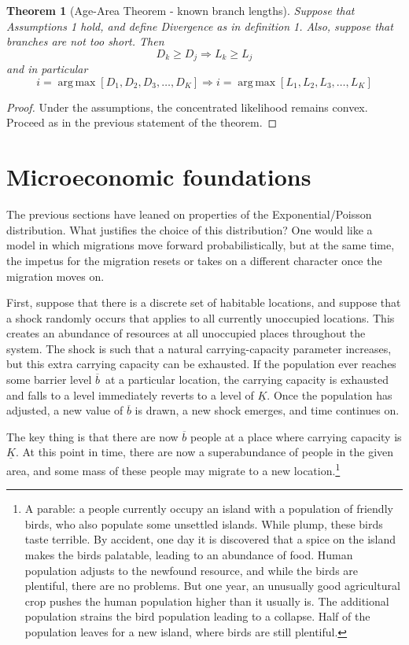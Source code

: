\documentclass[11pt]{article}
\newtheorem{theorem}{Theorem}
\DeclareMathOperator*{\argmax}{arg\,max}
\begin{document}
{\begin{theorem}[Age-Area Theorem  - known branch lengths]
Suppose that Assumptions 1 hold, and define Divergence as in definition 1. Also, suppose that branches are not too short.  Then  
\begin{equation*}
D_k \geq D_j \Longrightarrow L_k\geq L_j
\end{equation*}
and in particular
\begin{equation*}
i=\argmax\left[D_1,D_2,D_3,\hdots,D_{K}\right] \Longrightarrow i=\argmax\left[L_1,L_2,L_3,\hdots,L_K\right]
\end{equation*}
\end{theorem}

\begin{proof}
Under the assumptions, the concentrated likelihood remains convex. Proceed as in the previous statement of the theorem.
\end{proof}

\section{Microeconomic foundations}

The previous sections have leaned on properties of the Exponential/Poisson distribution. What justifies the choice of this distribution? One would like a model in which migrations move forward probabilistically, but at the same time, the impetus for the migration resets or takes on a different character once the migration moves on. 

First, suppose that there is a discrete set of habitable locations, and suppose that a shock randomly occurs that applies to all currently unoccupied locations. This creates an abundance of resources at all unoccupied places throughout the system. The shock is such that a natural carrying-capacity parameter increases, but this extra carrying capacity can be exhausted. If the population ever reaches some barrier level $\overline{b}$\ at a particular location, the carrying capacity is exhausted and falls to a level  immediately reverts to a level of $\underline{K}$. Once the population has adjusted, a new value of $\overline{b}$ is drawn, a new shock emerges, and time continues on. 

The key thing is that there are now $\overline{b}$ people at a place where carrying capacity is $\underline{K}$. At this point in time, there are now a superabundance of people in the given area, and some mass of these people may migrate to a new location.\footnote{A parable: a people currently occupy an island with a population of friendly birds, who also populate some unsettled islands. While plump, these birds taste terrible. By accident, one day it is discovered that a spice on the island makes the birds palatable, leading to an abundance of food. Human population adjusts to the newfound resource, and while the birds are plentiful, there are no problems. But one year, an unusually good agricultural crop pushes the human population higher than it usually is. The additional population strains the bird population leading to a collapse. Half of the population leaves for a new island, where birds are still plentiful.}



}
\end{document}
